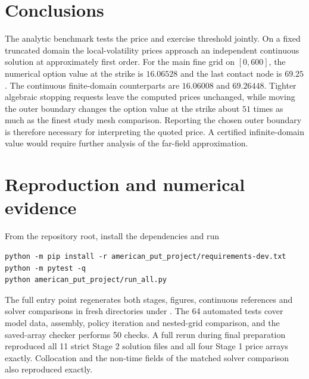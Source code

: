 \documentclass[11pt,a4paper]{article}
\numberwithin{equation}{section}
\begin{document}
\section{Conclusions}
The analytic benchmark tests the price and exercise threshold jointly.
On a fixed truncated domain the local-volatility prices approach an
independent continuous solution at approximately first order.
For the main fine grid on $[0,600]$, the numerical option value at the strike
is $16.06528$ and the last contact node is $69.25$. The continuous
finite-domain counterparts are $16.06008$ and $69.26448$.
Tighter algebraic stopping requests leave the computed prices
unchanged, while moving the outer boundary changes the option value at the
strike about $51$ times as much as the finest study mesh comparison.
Reporting the chosen outer boundary is therefore necessary for
interpreting the quoted price. A certified infinite-domain value
would require further analysis of the far-field approximation.

\appendix
\section{Reproduction and numerical evidence}\label{sec:reproduction}
From the repository root, install the dependencies and run
\begin{verbatim}
python -m pip install -r american_put_project/requirements-dev.txt
python -m pytest -q
python american_put_project/run_all.py
\end{verbatim}
The full entry point regenerates both stages, figures, continuous
references and solver comparisons in fresh directories under
. The 64 automated tests
cover model data, assembly, policy iteration and nested-grid comparison, and
the saved-array checker performs 50 checks. A full rerun during final
preparation reproduced all 11 strict Stage 2 solution files and all four
Stage 1 price arrays exactly. Collocation and the non-time fields of the
matched solver comparison also reproduced exactly.
\end{document}
